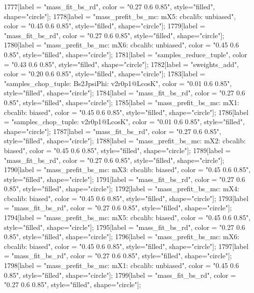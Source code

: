 {	1777[label = "mass_fit_bs_rd", color = "0.27 0.6 0.85", style="filled", shape="circle"];
	1778[label = "mass_prefit_bs_mc\nmassbin: mX5\nmassmodel: cbcalib\ntrigger: unbiased", color = "0.45 0.6 0.85", style="filled", shape="circle"];
	1779[label = "mass_fit_bs_rd", color = "0.27 0.6 0.85", style="filled", shape="circle"];
	1780[label = "mass_prefit_bs_mc\nmassbin: mX6\nmassmodel: cbcalib\ntrigger: unbiased", color = "0.45 0.6 0.85", style="filled", shape="circle"];
	1781[label = "samples_reduce_tuple", color = "0.43 0.6 0.85", style="filled", shape="circle"];
	1782[label = "sweights_add", color = "0.20 0.6 0.85", style="filled", shape="circle"];
	1783[label = "samples_chop_tuple\nmode: Bs2JpsiPhi\nversion: v2r0p1@LcosK", color = "0.01 0.6 0.85", style="filled", shape="circle"];
	1784[label = "mass_fit_bs_rd", color = "0.27 0.6 0.85", style="filled", shape="circle"];
	1785[label = "mass_prefit_bs_mc\nmassbin: mX1\nmassmodel: cbcalib\ntrigger: biased", color = "0.45 0.6 0.85", style="filled", shape="circle"];
	1786[label = "samples_chop_tuple\nversion: v2r0p1@LcosK", color = "0.01 0.6 0.85", style="filled", shape="circle"];
	1787[label = "mass_fit_bs_rd", color = "0.27 0.6 0.85", style="filled", shape="circle"];
	1788[label = "mass_prefit_bs_mc\nmassbin: mX2\nmassmodel: cbcalib\ntrigger: biased", color = "0.45 0.6 0.85", style="filled", shape="circle"];
	1789[label = "mass_fit_bs_rd", color = "0.27 0.6 0.85", style="filled", shape="circle"];
	1790[label = "mass_prefit_bs_mc\nmassbin: mX3\nmassmodel: cbcalib\ntrigger: biased", color = "0.45 0.6 0.85", style="filled", shape="circle"];
	1791[label = "mass_fit_bs_rd", color = "0.27 0.6 0.85", style="filled", shape="circle"];
	1792[label = "mass_prefit_bs_mc\nmassbin: mX4\nmassmodel: cbcalib\ntrigger: biased", color = "0.45 0.6 0.85", style="filled", shape="circle"];
	1793[label = "mass_fit_bs_rd", color = "0.27 0.6 0.85", style="filled", shape="circle"];
	1794[label = "mass_prefit_bs_mc\nmassbin: mX5\nmassmodel: cbcalib\ntrigger: biased", color = "0.45 0.6 0.85", style="filled", shape="circle"];
	1795[label = "mass_fit_bs_rd", color = "0.27 0.6 0.85", style="filled", shape="circle"];
	1796[label = "mass_prefit_bs_mc\nmassbin: mX6\nmassmodel: cbcalib\ntrigger: biased", color = "0.45 0.6 0.85", style="filled", shape="circle"];
	1797[label = "mass_fit_bs_rd", color = "0.27 0.6 0.85", style="filled", shape="circle"];
	1798[label = "mass_prefit_bs_mc\nmassbin: mX1\nmassmodel: cbcalib\ntrigger: unbiased", color = "0.45 0.6 0.85", style="filled", shape="circle"];
	1799[label = "mass_fit_bs_rd", color = "0.27 0.6 0.85", style="filled", shape="circle"];
}
